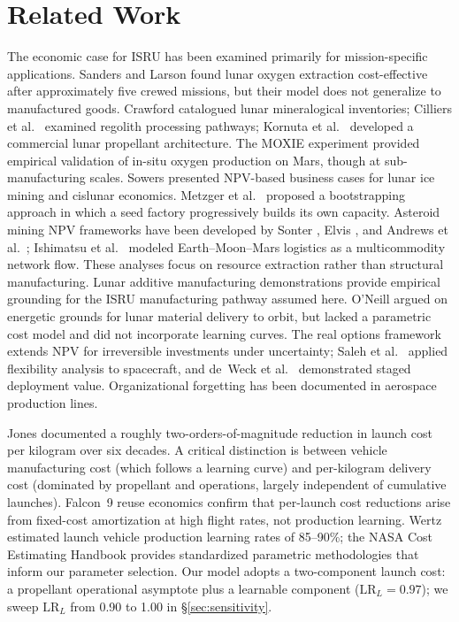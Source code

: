 \documentclass[preprint,12pt]{elsarticle}
\begin{document}
\section{Related Work}
\label{sec:related}

The economic case for ISRU has been examined primarily for mission-specific applications. Sanders and Larson \cite{sanders2015} found lunar oxygen extraction cost-effective after approximately five crewed missions, but their model does not generalize to manufactured goods. Crawford \cite{crawford2015} catalogued lunar mineralogical inventories; Cilliers et al.\ \cite{cilliers2023} examined regolith processing pathways; Kornuta et al.\ \cite{kornuta2019} developed a commercial lunar propellant architecture. The MOXIE experiment \cite{hecht2021} provided empirical validation of in-situ oxygen production on Mars, though at sub-manufacturing scales. Sowers \cite{sowers2021,sowers2023} presented NPV-based business cases for lunar ice mining and cislunar economics. Metzger et al.\ \cite{metzger2013} proposed a bootstrapping approach in which a seed factory progressively builds its own capacity. Asteroid mining NPV frameworks have been developed by Sonter \cite{sonter1997}, Elvis \cite{elvis2012}, and Andrews et al.\ \cite{andrews2015}; Ishimatsu et al.\ \cite{ishimatsu2016} modeled Earth--Moon--Mars logistics as a multicommodity network flow. These analyses focus on resource extraction rather than structural manufacturing. Lunar additive manufacturing demonstrations \cite{werkheiser2015,cesaretti2014} provide empirical grounding for the ISRU manufacturing pathway assumed here. O'Neill \cite{oneill1974,oneill1976} argued on energetic grounds for lunar material delivery to orbit, but lacked a parametric cost model and did not incorporate learning curves. The real options framework \cite{dixit1994} extends NPV for irreversible investments under uncertainty; Saleh et al.\ \cite{saleh2003} applied flexibility analysis to spacecraft, and de~Weck et al.\ \cite{deweck2004} demonstrated staged deployment value. Organizational forgetting \cite{benkard2000,thompson2012} has been documented in aerospace production lines.

Jones \cite{jones2018,jones2020,jones2022} documented a roughly two-orders-of-magnitude reduction in launch cost per kilogram over six decades. A critical distinction is between vehicle manufacturing cost (which follows a learning curve) and per-kilogram delivery cost (dominated by propellant and operations, largely independent of cumulative launches). Falcon~9 reuse economics \cite{zapata2019} confirm that per-launch cost reductions arise from fixed-cost amortization at high flight rates, not production learning. Wertz \cite{wertz2011} estimated launch vehicle production learning rates of 85--90\%; the NASA Cost Estimating Handbook \cite{nasa2015handbook} provides standardized parametric methodologies that inform our parameter selection. Our model adopts a two-component launch cost: a propellant operational asymptote plus a learnable component ($\mathrm{LR}_L = 0.97$); we sweep $\mathrm{LR}_L$ from 0.90 to 1.00 in \S\ref{sec:sensitivity}.
\end{document}
